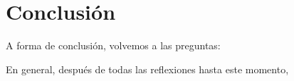 \section{Conclusión}


A forma de conclusión, volvemos a las preguntas:

En general, después de todas las reflexiones hasta este momento,
